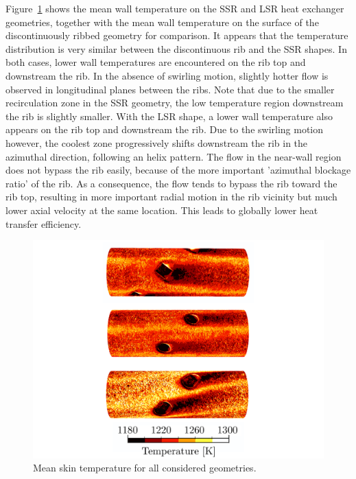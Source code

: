 Figure~\ref{Twall_compare} shows the mean wall temperature on the SSR and LSR heat exchanger geometries, together with the mean wall temperature on the surface of the discontinuously ribbed geometry for comparison. It appears that the temperature distribution is very similar between the discontinuous rib and the SSR shapes. In both cases, lower wall temperatures are encountered on the rib top and downstream the rib. In the absence of swirling motion, slightly hotter flow is observed in longitudinal planes between the ribs. Note that due to the smaller recirculation zone in the SSR geometry, the low temperature region downstream the rib is slightly smaller. With the LSR shape, a lower wall temperature also appears on the rib top and downstream the rib. Due to the swirling motion however, the coolest zone progressively shifts downstream the rib in the azimuthal direction, following an helix pattern. The flow in the near-wall region does not bypass the rib easily, because of the more important 'azimuthal blockage ratio' of the rib. As a consequence, the flow tends to bypass the rib toward the rib top, resulting in more important radial motion in the rib vicinity but much lower axial velocity at the same location. This leads to globally lower heat transfer efficiency.\\

\begin{figure}[h]
\centering
\includegraphics[width=\linewidth]{fig/applications/optim/Twall_compare.pdf}
\caption{Mean skin temperature for all considered geometries.}
\label{Twall_compare}
\end{figure}

